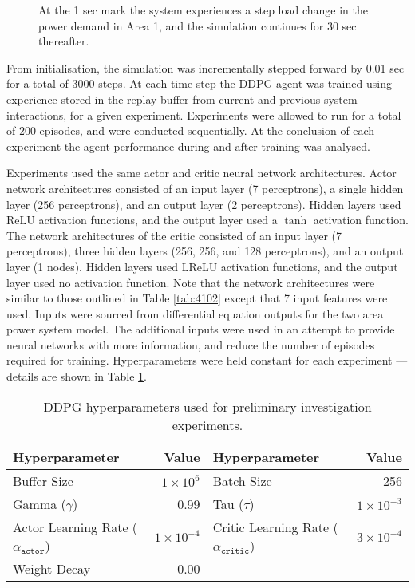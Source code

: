 \begin{figure}[h]
	\centering
	
	\caption[Preliminary investigation load demand step change]{At the 1 sec mark the system experiences a step load change in the power demand in Area 1, and the simulation continues for 30 sec thereafter.}
	\label{fig:5001_demand_profile}
\end{figure}

From initialisation, the simulation was incrementally stepped forward by 0.01 sec for a total of 3000 steps. At each time step the DDPG agent was trained using experience stored in the replay buffer from current and previous system interactions, for a given experiment. Experiments were allowed to run for a total of 200 episodes, and were conducted sequentially. At the conclusion of each experiment the agent performance during and after training was analysed.

Experiments used the same actor and critic neural network architectures. Actor network architectures consisted of an input layer (7 perceptrons), a single hidden layer (256 perceptrons), and an output layer (2 perceptrons). Hidden layers used ReLU activation functions, and the output layer used a $\tanh$ activation function. The network architectures of the critic consisted of an input layer (7 perceptrons), three hidden layers (256, 256, and 128 perceptrons), and an output layer (1 nodes). Hidden layers used LReLU activation functions, and the output layer used no activation function. Note that the network architectures were similar to those outlined in Table \ref{tab:4102} except that 7 input features were used. Inputs were sourced from differential equation outputs for the two area power system model. The additional inputs were used in an attempt to provide neural networks with more information, and reduce the number of episodes required for training. Hyperparameters were held constant for each experiment --- details are shown in Table \ref{tab:5000_hyperparameters}.

\begin{table}[h]
	\centering
	\caption{DDPG hyperparameters used for preliminary investigation experiments.}
	\begin{tabular}{lrlr}
	\toprule
	\textbf{Hyperparameter} & \textbf{Value} & \textbf{Hyperparameter} & \textbf{Value} \\
	\midrule
	Buffer Size 	 & $1 \times 10^6$  & Batch Size 	& 256 \\
	Gamma ($\gamma$) & 0.99 	& Tau ($\tau$) 	& $1 \times 10^{-3}$ \\
	Actor Learning Rate ($\alpha_{\texttt{actor}}$) & $1 \times 10^{-4}$ & Critic Learning Rate ($\alpha_{\texttt{critic}}$) & $3 \times 10^{-4} $ \\
	Weight Decay & 0.00 & & \\
	\bottomrule
	\end{tabular}\label{tab:5000_hyperparameters}
\end{table}

